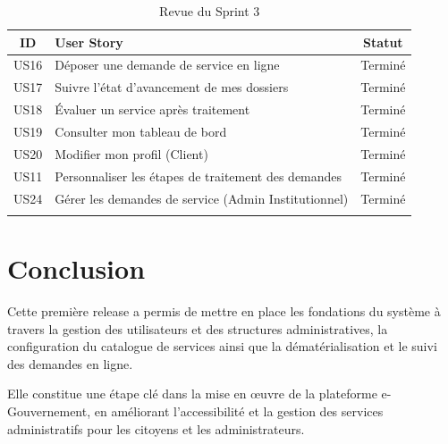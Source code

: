 \begin{longtable}{|c|p{9cm}|c|}
\hline
\rowcolor{orange!30}
\textbf{ID} & \textbf{User Story} & \textbf{Statut} \\ \hline
US16 & Déposer une demande de service en ligne & \textcolor{green!60!black}{Terminé} \\ \hline
US17 & Suivre l'état d'avancement de mes dossiers & \textcolor{green!60!black}{Terminé} \\ \hline
US18 & Évaluer un service après traitement & \textcolor{green!60!black}{Terminé} \\ \hline
US19 & Consulter mon tableau de bord & \textcolor{green!60!black}{Terminé} \\ \hline
US20 & Modifier mon profil (Client) & \textcolor{green!60!black}{Terminé} \\ \hline
US11 & Personnaliser les étapes de traitement des demandes & \textcolor{green!60!black}{Terminé} \\ \hline
US24 & Gérer les demandes de service (Admin Institutionnel) & \textcolor{green!60!black}{Terminé} \\ \hline
\caption{Revue du Sprint 3}
\label{tab:revue-sprint3}
\end{longtable}





\section{Conclusion}

Cette première release a permis de mettre en place les fondations du système à travers la gestion des utilisateurs et des structures administratives, la configuration du catalogue de services ainsi que la dématérialisation et le suivi des demandes en ligne.

Elle constitue une étape clé dans la mise en œuvre de la plateforme e-Gouvernement, en améliorant l’accessibilité et la gestion des services administratifs pour les citoyens et les administrateurs.
 
